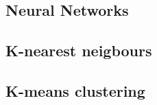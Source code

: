         
    
    \subsection{Neural Networks}\label{subsec:NN}
    
    \subsection{K-nearest neigbours}\label{subsec:k_neig}
    
    \subsection{K-means clustering}\label{subsec:k_means}
    